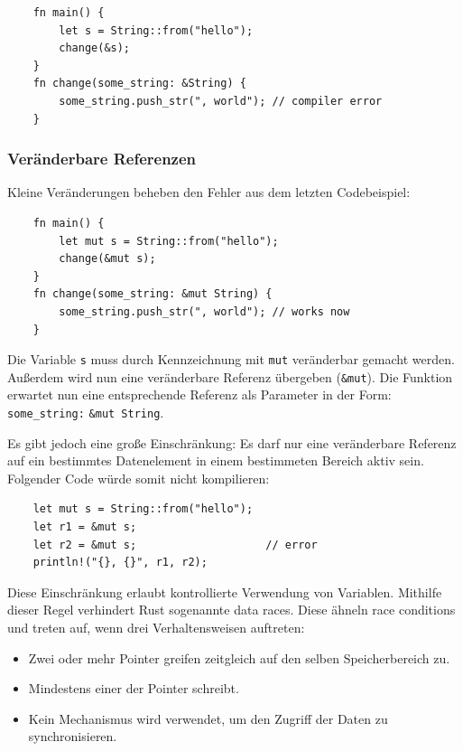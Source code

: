 \begin{lstlisting}
    fn main() {
        let s = String::from("hello");
        change(&s);
    }
    fn change(some_string: &String) {
        some_string.push_str(", world"); // compiler error
    }
\end{lstlisting}

\subsubsection{Veränderbare Referenzen}

Kleine Veränderungen beheben den Fehler aus dem letzten Codebeispiel:

\begin{lstlisting}
    fn main() {
        let mut s = String::from("hello");
        change(&mut s);
    }
    fn change(some_string: &mut String) {
        some_string.push_str(", world"); // works now
    }
\end{lstlisting}

Die Variable \verb"s" muss durch Kennzeichnung mit \verb"mut" veränderbar gemacht werden. Außerdem wird nun eine veränderbare Referenz übergeben (\verb"&mut"). Die Funktion erwartet nun eine entsprechende Referenz als Parameter in der Form: \verb"some_string:" \verb"&mut String".

Es gibt jedoch eine große Einschränkung: Es darf nur eine veränderbare Referenz auf ein bestimmtes Datenelement in einem bestimmeten Bereich aktiv sein. Folgender Code würde somit nicht kompilieren:

\begin{lstlisting}
    let mut s = String::from("hello");
    let r1 = &mut s;
    let r2 = &mut s;                    // error
    println!("{}, {}", r1, r2);
\end{lstlisting}

Diese Einschränkung erlaubt kontrollierte Verwendung von Variablen. Mithilfe dieser Regel verhindert Rust sogenannte \glqq data races\grqq{}. Diese ähneln \glqq race conditions\grqq{} und treten auf, wenn drei Verhaltensweisen auftreten:

\begin{itemize}
    \item Zwei oder mehr Pointer greifen zeitgleich auf den selben Speicherbereich zu.
    \item Mindestens einer der Pointer schreibt.
    \item Kein Mechanismus wird verwendet, um den Zugriff der Daten zu synchronisieren.
\end{itemize}

